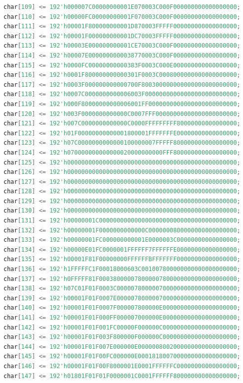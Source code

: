 \documentclass[UTF8]{article}
\theoremstyle{MyLineTheoremStyle} %
\theoremstyle{MyBlockTheoremStyle} %
\theoremstyle{MySubsubsectionStyle} %
\begin{document}
\begin{lstlisting}[language=Verilog, caption={小组成员姓名显示Verilog代码修改部分}, label={lst:verilog_code2}]
char[109] <= 192'h000007C00000000001E070003C000F000000000000000000;
char[110] <= 192'h00000FC00000000001F070003C000F000000000000000000;
char[111] <= 192'h00001F800000000001D870003FFFFF000000000000000000;
char[112] <= 192'h00001F000000000001DC70003FFFFF000000000000000000;
char[113] <= 192'h00003E000000000001CE70003C000F000000000000000000;
char[114] <= 192'h00007E0000000000038770003C000F000000000000000000;
char[115] <= 192'h0000FC00000000000383F0003C000E000000000000000000;
char[116] <= 192'h0001F800000000000301F0003C0008000000000000000000;
char[117] <= 192'h0003F000000000000700F800300000000000000000000000;
char[118] <= 192'h0007C0000000000006003F00000000000000000000000000;
char[119] <= 192'h000F80000000000006001FF0000000000000000000000000;
char[120] <= 192'h003F0000000000000C0007FFF00000000000000000000000;
char[121] <= 192'h007C0000000000000C0000FFFFFFFFF80000000000000000;
char[122] <= 192'h01F00000000000001800001FFFFFFFE00000000000000000;
char[123] <= 192'h07C0000000000000100000007FFFFF800000000000000000;
char[124] <= 192'h070000000000000020000000000FFF800000000000000000;
char[125] <= 192'h000000000000000000000000000000000000000000000000;
char[126] <= 192'h000000000000000000000000000000000000000000000000;
char[127] <= 192'h000000000000000000000000000000000000000000000000;
char[128] <= 192'h000000000000000000000000000000000000000000000000;
char[129] <= 192'h000000000000000000000000000000000000000000000000;
char[130] <= 192'h000000000000000000000000000000000000000000000000;
char[131] <= 192'h00000001C000000000000000000000000000000000000000;
char[132] <= 192'h00000001F0000000000000C0000000800000000000000000;
char[133] <= 192'h00000001FC000000000001E0000003C00000000000000000;
char[134] <= 192'h00000E01FC0000001FFFFFF7FFFFFFE00000000000000000;
char[135] <= 192'h00001F81F00000000FFFFFFBFFFFFFF00000000000000000;
char[136] <= 192'h1FFFFFC1F00018000603C001007800000000000000000000;
char[137] <= 192'h0FFFFF81F000380000078000007800000000000000000000;
char[138] <= 192'h07C01F01F0003C0000078000007000000000000000000000;
char[139] <= 192'h00001F01F0007E0000078000007000000000000000000000;
char[140] <= 192'h00001F01F0007F000007800000E000000000000000000000;
char[141] <= 192'h00001F01F000FF000007000000E000000000000000000000;
char[142] <= 192'h00001F01F001FC00000F000000C000000000000000000000;
char[143] <= 192'h00001F01F003F800000F000000C000000000000000000000;
char[144] <= 192'h00001F01F007E000000E0000008002000000000000000000;
char[145] <= 192'h00001F01F00FC000000E0001818007000000000000000000;
char[146] <= 192'h00001F01F00F8000001E0001FFFFFFC00000000000000000;
char[147] <= 192'h01801F01F01F0000001C0001FFFFFF800000000000000000;

\end{lstlisting}
\end{document}
